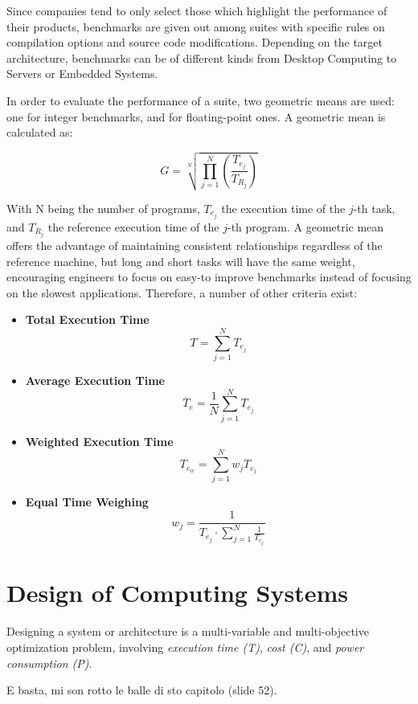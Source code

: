 Since companies tend to only select those which highlight the performance of their products, benchmarks are given out among suites with specific rules on compilation options and source code modifications. Depending on the target architecture, benchmarks can be of different kinds from Desktop Computing to Servers or Embedded Systems.

In order to evaluate the performance of a suite, two geometric means are used: one for integer benchmarks, and for floating-point ones. A geometric mean is calculated as:

$$ G = \sqrt[N]{\prod_{j=1}^{N}\left(\frac{T_{e_j}}{T_{R_j}}\right)} $$

With N being the number of programs, $T_{e_j}$ the execution time of the $j$-th task, and $T_{R_j}$ the reference execution time of the $j$-th program. A geometric mean offers the advantage of maintaining consistent relationships regardless of the reference machine, but long and short tasks will have the same weight, encouraging engineers to focus on easy-to improve benchmarks instead of focusing on the slowest applications. Therefore, a number of other criteria exist:

\begin{itemize}
    \item \textbf{Total Execution Time} \\
    $$ T = \sum_{j=1}^NT_{e_j}$$
    \item \textbf{Average Execution Time} \\
    $$ \overline{T}_e = \frac{1}{N} \sum_{j=1}^NT_{e_j}$$
    \item \textbf{Weighted Execution Time} \\
    $$ T_{e_w} = \sum_{j=1}^Nw_jT_{e_j}$$
    \item \textbf{Equal Time Weighing} \\
    $$ w_j = \frac{1}{T_{e_j} \cdot \sum_{j=1}^N\frac{1}{T_{e_j}}}$$
    
\end{itemize}

\section{Design of Computing Systems}
Designing a system or architecture is a multi-variable and multi-objective optimization problem, involving \textit{execution time (T)}, \textit{cost (C)}, and \textit{power consumption (P)}.

E basta, mi son rotto le balle di sto capitolo (slide 52).

